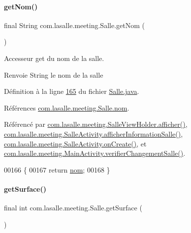 \paragraph{\texorpdfstring{get\+Nom()}{getNom()}}
{\footnotesize\ttfamily final String com.\+lasalle.\+meeting.\+Salle.\+get\+Nom (\begin{DoxyParamCaption}{ }\end{DoxyParamCaption})}



Accesseur get du nom de la salle. 

\begin{DoxyReturn}{Renvoie}
String le nom de la salle 
\end{DoxyReturn}


Définition à la ligne \hyperlink{_salle_8java_source_l00165}{165} du fichier \hyperlink{_salle_8java_source}{Salle.\+java}.



Références \hyperlink{_salle_8java_source_l00034}{com.\+lasalle.\+meeting.\+Salle.\+nom}.



Référencé par \hyperlink{_salle_view_holder_8java_source_l00077}{com.\+lasalle.\+meeting.\+Salle\+View\+Holder.\+afficher()}, \hyperlink{_salle_activity_8java_source_l00103}{com.\+lasalle.\+meeting.\+Salle\+Activity.\+afficher\+Information\+Salle()}, \hyperlink{_salle_activity_8java_source_l00060}{com.\+lasalle.\+meeting.\+Salle\+Activity.\+on\+Create()}, et \hyperlink{_main_activity_8java_source_l00291}{com.\+lasalle.\+meeting.\+Main\+Activity.\+verifier\+Changement\+Salle()}.


\begin{DoxyCode}
00166     \{
00167         \textcolor{keywordflow}{return} \hyperlink{classcom_1_1lasalle_1_1meeting_1_1_salle_a3641e82a9fa78c5dc8bd9a5b92bae482}{nom};
00168     \}
\end{DoxyCode}
\mbox{\label{classcom_1_1lasalle_1_1meeting_1_1_salle_ad9dad6b4cfeb020195d4cde268af885f}} 
\paragraph{\texorpdfstring{get\+Surface()}{getSurface()}}
{\footnotesize\ttfamily final int com.\+lasalle.\+meeting.\+Salle.\+get\+Surface (\begin{DoxyParamCaption}{ }\end{DoxyParamCaption})}



